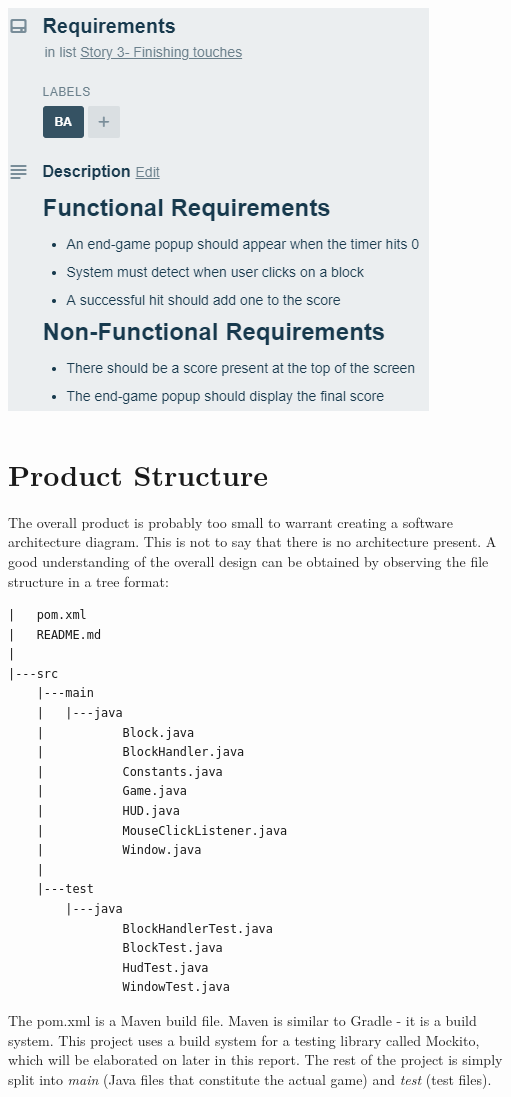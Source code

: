 \documentclass[12pt]{article}
\begin{document}
    \begin{center}
        \includegraphics[scale=0.8]{story3}
    \end{center}
    
    
\section{Product Structure}
The overall product is probably too small to warrant creating a software architecture diagram. This is not to say that there is no architecture present. A good understanding of the overall design can be obtained by observing the file structure in a tree format:

\begin{verbatim}
|   pom.xml
|   README.md
|
|---src
    |---main
    |   |---java
    |           Block.java
    |           BlockHandler.java
    |           Constants.java
    |           Game.java
    |           HUD.java
    |           MouseClickListener.java
    |           Window.java
    |
    |---test
        |---java
                BlockHandlerTest.java
                BlockTest.java
                HudTest.java
                WindowTest.java
\end{verbatim}

The pom.xml is a Maven build file. Maven is similar to Gradle - it is a build system. This project uses a build system for a testing library called Mockito, which will be elaborated on later in this report. The rest of the project is simply split into \emph{main} (Java files that constitute the actual game) and \emph{test} (test files). 
\end{document}
